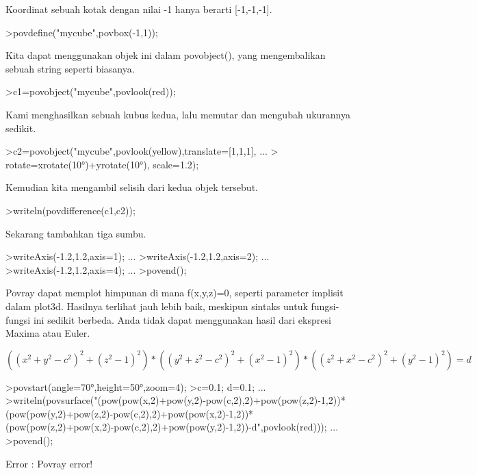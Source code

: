 \documentclass{article}
\begin{document}
\begin{eulernotebook}
\begin{eulercomment}
Koordinat sebuah kotak dengan nilai -1 hanya berarti [-1,-1,-1].
\end{eulercomment}
\begin{eulerprompt}
>povdefine("mycube",povbox(-1,1));
\end{eulerprompt}
\begin{eulercomment}
Kita dapat menggunakan objek ini dalam povobject(), yang mengembalikan
sebuah string seperti biasanya.
\end{eulercomment}
\begin{eulerprompt}
>c1=povobject("mycube",povlook(red));
\end{eulerprompt}
\begin{eulercomment}
Kami menghasilkan sebuah kubus kedua, lalu memutar dan mengubah
ukurannya sedikit.
\end{eulercomment}
\begin{eulerprompt}
>c2=povobject("mycube",povlook(yellow),translate=[1,1,1], ...
>  rotate=xrotate(10°)+yrotate(10°), scale=1.2);
\end{eulerprompt}
\begin{eulercomment}
Kemudian kita mengambil selisih dari kedua objek tersebut.
\end{eulercomment}
\begin{eulerprompt}
>writeln(povdifference(c1,c2));
\end{eulerprompt}
\begin{eulercomment}
Sekarang tambahkan tiga sumbu.
\end{eulercomment}
\begin{eulerprompt}
>writeAxis(-1.2,1.2,axis=1); ...
>writeAxis(-1.2,1.2,axis=2); ...
>writeAxis(-1.2,1.2,axis=4); ...
>povend();
\end{eulerprompt}
\begin{eulercomment}
Povray dapat memplot himpunan di mana f(x,y,z)=0, seperti parameter
implisit dalam plot3d. Hasilnya terlihat jauh lebih baik, meskipun
sintaks untuk fungsi-fungsi ini sedikit berbeda. Anda tidak dapat
menggunakan hasil dari ekspresi Maxima atau Euler.

\end{eulercomment}
\begin{eulerformula}
\[
((x^2+y^2-c^2)^2+(z^2-1)^2)*((y^2+z^2-c^2)^2+(x^2-1)^2)*((z^2+x^2-c^2)^2+(y^2-1)^2)=d
\]
\end{eulerformula}
\begin{eulerprompt}
>povstart(angle=70°,height=50°,zoom=4);
>c=0.1; d=0.1; ...
>writeln(povsurface("(pow(pow(x,2)+pow(y,2)-pow(c,2),2)+pow(pow(z,2)-1,2))*(pow(pow(y,2)+pow(z,2)-pow(c,2),2)+pow(pow(x,2)-1,2))*(pow(pow(z,2)+pow(x,2)-pow(c,2),2)+pow(pow(y,2)-1,2))-d",povlook(red))); ...
>povend();
\end{eulerprompt}
\begin{euleroutput}
  Error : Povray error!
  

\end{euleroutput}
\end{eulernotebook}
\end{document}
